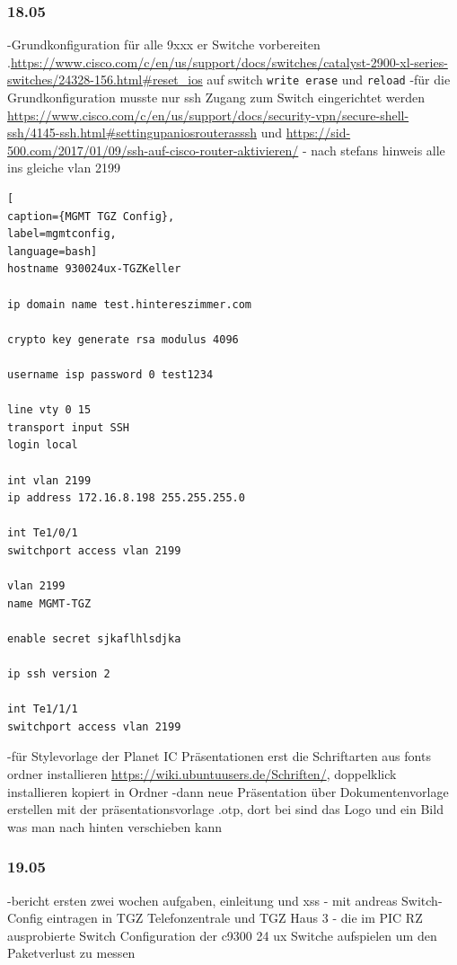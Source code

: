 \documentclass[english,runningheads,a4paper]{llncs}[2018/03/10]
\begin{document}
\subsubsection{18.05}
-Grundkonfiguration für alle 9xxx er Switche vorbereiten
.\url{https://www.cisco.com/c/en/us/support/docs/switches/catalyst-2900-xl-series-switches/24328-156.html#reset_ios} auf switch \texttt{write erase} und \texttt{reload}
-für die Grundkonfiguration musste nur ssh Zugang zum Switch eingerichtet werden \url{https://www.cisco.com/c/en/us/support/docs/security-vpn/secure-shell-ssh/4145-ssh.html#settingupaniosrouterasssh} und \url{https://sid-500.com/2017/01/09/ssh-auf-cisco-router-aktivieren/}
- nach stefans hinweis alle ins gleiche vlan 2199
\begin{lstlisting}[
caption={MGMT TGZ Config},
label=mgmtconfig,
language=bash]
hostname 930024ux-TGZKeller

ip domain name test.hintereszimmer.com

crypto key generate rsa modulus 4096

username isp password 0 test1234

line vty 0 15
transport input SSH
login local

int vlan 2199
ip address 172.16.8.198 255.255.255.0

int Te1/0/1
switchport access vlan 2199

vlan 2199
name MGMT-TGZ

enable secret sjkaflhlsdjka

ip ssh version 2

int Te1/1/1 
switchport access vlan 2199
\end{lstlisting}
-für Stylevorlage der Planet IC Präsentationen erst die Schriftarten aus fonts ordner installieren \url{https://wiki.ubuntuusers.de/Schriften/}, doppelklick installieren kopiert in Ordner 
-dann neue Präsentation über Dokumentenvorlage erstellen mit der präsentationsvorlage .otp, dort bei  sind das Logo und ein Bild was man nach hinten verschieben kann
\subsubsection{19.05}
-bericht ersten zwei wochen aufgaben, einleitung und xss
- mit andreas Switch-Config eintragen in TGZ Telefonzentrale und TGZ Haus 3
- die im PIC RZ ausprobierte Switch Configuration der c9300 24 ux Switche aufspielen um den Paketverlust zu messen
\end{document}
